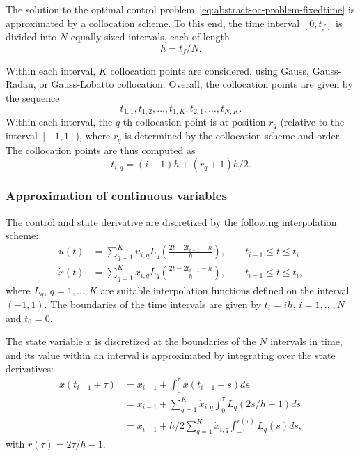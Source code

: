 \documentclass[a4paper,11pt,DIV12]{scrartcl}
\theoremstyle{remark}
\begin{document}
The solution to the optimal control problem~\eqref{eq:abstract-oc-problem-fixedtime} is approximated by a collocation scheme.
To this end, the time interval $[0,t_f]$ is divided into $N$ equally sized intervals, each of length
\begin{equation}
\label{eq:collocation-intervals}
h = t_f / N.
\end{equation}

Within each interval, $K$ collocation points are considered, using Gauss, Gauss-Radau, or Gauss-Lobatto collocation.
Overall, the collocation points are given by the sequence
\begin{equation}
  \label{eq:collocation-points}
  t_{1,1}, t_{1,2}, \dotsc, t_{1,K}, t_{2,1}, \dotsc, t_{N,K}.
\end{equation}
Within each interval, the $q$-th collocation point is at position $r_q$ (relative to the interval $[-1,1]$), where $r_q$ is determined by the collocation scheme and order.
The collocation points are thus computed as
\begin{equation}
  \label{eq:collocation-points-formula}
  t_{i,q} = (i-1) h + (r_q + 1) h / 2.
\end{equation}

\subsubsection{Approximation of continuous variables}
\label{sec:appr-syst-vari}

The control and state derivative are discretized by the following interpolation scheme:
\begin{equation}
  \label{eq:variable-discretization}
  \begin{aligned}
    u(t) &= \sum_{q=1}^K u_{i,q} L_q(\frac{2 t - 2 t_{i-1} - h}{h}), \qquad t_{i-1} \leq t \leq t_i \\
    \dot x(t) &= \sum_{q=1}^K \dot x_{i,q} L_q(\frac{2 t - 2 t_{i-1} - h}{h}), \qquad t_{i-1} \leq t \leq t_i,
  \end{aligned}
\end{equation}
where $L_q$, $q=1,\ldots,K$ are suitable interpolation functions defined on the interval $(-1,1)$.
The boundaries of the time intervals are given by $t_i = i h$, $i=1,\dotsc,N$ and $t_0 = 0$.

The state variable $x$ is discretized at the boundaries of the $N$ intervals in time, and its value within an interval is approximated by integrating over the state derivatives:
\begin{equation}
  \label{eq:state-approx}
  \begin{aligned}
    x(t_{i-1} + \tau) &= x_{i-1} + \int_{0}^{\tau} \dot x(t_{i-1} + s) ds \\
    &= x_{i-1} + \sum_{q=1}^K \dot x_{i,q} \int_0^\tau L_q(2s/h - 1) ds \\
    &= x_{i-1} + h/2 \sum_{q=1}^K \dot x_{i,q} \int_{-1}^{r(\tau)} L_q(s) ds,
  \end{aligned}
\end{equation}
with $r(\tau) = 2\tau/h - 1$.
\end{document}

